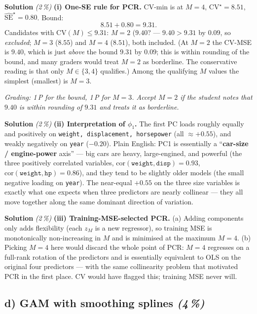 \documentclass[11pt,a4paper]{article}
\newcommand{\subpoints}[1]{\textit{(#1\,\%)}}
\newcommand{\sol}{\noindent\textbf{Solution}}
\begin{document}
\sol{} \subpoints{2} \textbf{(i) One-SE rule for PCR.} CV-min is at $M = 4$, $\mathrm{CV}^\star = 8.51$,
$\widehat{\mathrm{SE}}^\star = 0.80$. Bound:
$$8.51 + 0.80 = \boxed{9.31}.$$
Candidates with $\mathrm{CV}(M) \leq 9.31$: $M = 2$ ($9.40$? --- $9.40 > 9.31$ by $0.09$, so
\emph{excluded}; $M=3$ ($8.55$) and $M=4$ ($8.51$), both included. (At $M=2$ the CV-MSE is $9.40$,
which is just \emph{above} the bound $9.31$ by $0.09$; this is within rounding of the bound, and
many graders would treat $M=2$ as borderline. The conservative reading is that only $M\in\{3,4\}$
qualifies.) Among the qualifying $M$ values the simplest (smallest) is $\boxed{M = 3}$.

\noindent\emph{Grading: 1\,P for the bound, 1\,P for $M=3$. Accept $M=2$ if the student notes that
$9.40$ is within rounding of $9.31$ and treats it as borderline.}

\medskip
\sol{} \subpoints{2} \textbf{(ii) Interpretation of $\phi_1$.} The first PC loads roughly equally
and positively on \texttt{weight, displacement, horsepower} (all $\approx +0.55$), and weakly
negatively on \texttt{year} ($-0.20$). Plain English: PC1 is essentially a ``\textbf{car-size /
engine-power} axis'' --- big cars are heavy, large-engined, and powerful (the three positively
correlated variables, $\mathrm{cor}(\texttt{weight},\texttt{disp})=0.93$,
$\mathrm{cor}(\texttt{weight},\texttt{hp})=0.86$), and they tend to be slightly older models
(the small negative loading on \texttt{year}). The near-equal $+0.55$ on the three size variables
is exactly what one expects when three predictors are nearly collinear --- they all move together
along the same dominant direction of variation.

\medskip
\sol{} \subpoints{2} \textbf{(iii) Training-MSE-selected PCR.} (a) Adding components only adds
flexibility (each $z_M$ is a new regressor), so training MSE is monotonically non-increasing in
$M$ and is minimised at the maximum $M = 4$. (b) Picking $M=4$ here would discard the whole point
of PCR: $M = 4$ regresses on a full-rank rotation of the predictors and is essentially equivalent
to OLS on the original four predictors --- with the same collinearity problem that motivated PCR in
the first place. CV would have flagged this; training MSE never will.

\subsection*{d) GAM with smoothing splines \subpoints{4}}
\end{document}
